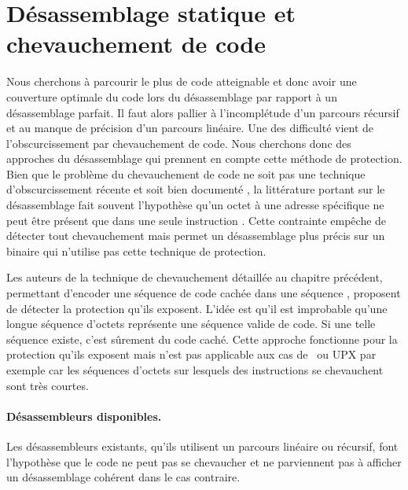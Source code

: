 \section{Désassemblage statique et chevauchement de code}
Nous cherchons à parcourir le plus de code atteignable et donc avoir une couverture optimale du code lors du désassemblage par rapport à un désassemblage parfait.
Il faut alors pallier à l'incomplétude d'un parcours récursif et au manque de précision d'un parcours linéaire.
Une des difficulté vient de l'obscurcissement par chevauchement de code. 
Nous cherchons donc des approches du désassemblage qui prennent en compte cette méthode de protection.
\\

Bien que le problème du chevauchement de code ne soit pas une technique d'obscurcissement récente et soit bien documenté \cite{PMA}, la littérature portant sur le désassemblage fait souvent l'hypothèse qu'un octet à une adresse spécifique ne peut être présent que dans une seule instruction \cite{KruegelRVV04}. Cette contrainte empêche de détecter tout chevauchement mais permet un désassemblage plus précis sur un binaire qui n'utilise pas cette technique de protection.



Les auteurs de la technique de chevauchement détaillée au chapitre précédent, permettant d'encoder une séquence de code cachée dans une séquence \cite{JLH13}, proposent de détecter la protection qu'ils exposent. L'idée est qu'il est improbable qu'une longue séquence d'octets représente une séquence valide de code. Si une telle séquence existe, c'est sûrement du code caché. Cette approche fonctionne pour la protection qu'ils exposent mais n'est pas applicable aux cas de \telock\ ou UPX par exemple car les séquences d'octets sur lesquels des instructions se chevauchent sont très courtes.

\paragraph{Désassembleurs disponibles.}
Les désassembleurs existants, qu'ils utilisent un parcours linéaire ou récursif, font l'hypothèse que le code ne peut pas se chevaucher et ne parviennent pas à afficher un désassemblage cohérent dans le cas contraire.


